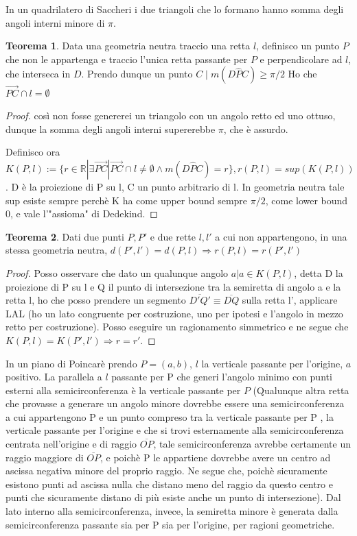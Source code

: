 \documentclass[a4paper,10pt]{article}
\theoremstyle{definition}
\newcommand{\re}{\mathbb{R}} %
\theoremstyle{indentdefinition}
\theoremstyle{indentpostulate}
\theoremstyle{indenttheorem}
\newtheorem{thm}{Teorema}[section]
\theoremstyle{myremark}
\theoremstyle{indentgeneral}
\newenvironment{myboxed} 
{\noindent\begin{lrbox}{\mybox}\begin{minipage}{\textwidth}}
{\end{minipage}\end{lrbox}\fbox{\usebox{\mybox}}}
\begin{document}
In un quadrilatero di Saccheri i due triangoli che lo formano hanno somma degli angoli interni minore di $\pi$.

\begin{myboxed}
\begin{thm}  Data una geometria neutra traccio una retta $l$, definisco un punto $P$ che non le appartenga e traccio l'unica retta passante per $P$ e perpendicolare ad $l$, che interseca in $D$. Prendo dunque un punto $C\mid m(D\hat{P}C) \geq \pi /2$ Ho che $\overrightarrow{PC} \cap l = \emptyset$    
\end{thm} 
\end{myboxed}

\begin{proof}    così non fosse genererei un triangolo con un angolo retto ed uno ottuso, dunque la somma degli angoli interni supererebbe $\pi$, che è assurdo.

Definisco ora $K(P,l):= \{ r \in \re| \exists \overrightarrow{PC} | \overrightarrow{PC} \cap l \neq \emptyset \land m(D \hat{P} C)=r \} , r(P,l)=sup(K(P,l))$. D è la proiezione di P su l, C un punto arbitrario di l. In geometria neutra tale sup esiste sempre perchè K ha come upper bound sempre $\pi /2$, come lower bound 0, e vale l'"assioma" di Dedekind.  \end{proof} 

\begin{thm}   Dati due punti $P,P'$ e due rette $l,l'$ a cui non appartengono, in una stessa geometria neutra, $d(P',l')=d(P,l) \Rightarrow r(P,l)=r(P',l')$    \end{thm} 

\begin{proof}
    Posso osservare che dato un qualunque angolo $a|a \in K(P,l)$, detta D la proiezione di P su l e Q  il punto di intersezione tra la semiretta di angolo a e la retta l, ho che posso prendere un segmento $\overline{D'Q'} \equiv \overline{DQ}$ sulla retta l', applicare LAL (ho un lato congruente per costruzione, uno per ipotesi e l'angolo in mezzo retto per costruzione). Posso eseguire un ragionamento simmetrico e ne segue che $K(P,l)=K(P',l')\Rightarrow r=r'$.
\end{proof}

In un piano di Poincarè prendo $P=(a,b)$, $l$ la verticale passante per l'origine, $a$ positivo. La parallela a $l$ passante per P che generi l'angolo minimo con punti esterni alla semicirconferenza è la verticale passante per $P$ (Qualunque altra retta che provasse a generare un angolo minore dovrebbe essere una semicirconferenza a cui appartengono P e un punto compreso tra la verticale passante per P , la verticale passante per l'origine e che si trovi esternamente alla semicirconferenza centrata nell'origine e di raggio $\overline{OP}$, tale semicirconferenza avrebbe certamente un raggio maggiore di $\overline{OP}$, e poichè P le appartiene dovrebbe avere un centro ad ascissa negativa minore del proprio raggio. Ne segue che, poichè sicuramente esistono punti ad ascissa nulla che distano meno del raggio da questo centro e punti che sicuramente distano di più esiste anche un punto di intersezione). Dal lato interno alla semicirconferenza, invece, la semiretta minore è generata dalla semicirconferenza passante sia per P sia per l'origine, per ragioni geometriche.
\end{document}
